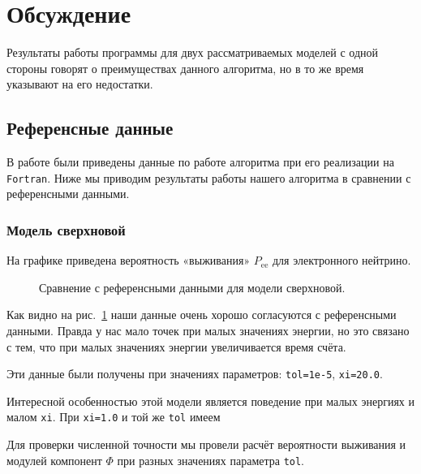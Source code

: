 \documentclass[12pt]{article}
\begin{document}
\section{Обсуждение}

Результаты работы программы для двух рассматриваемых моделей с одной стороны
говорят о преимуществах данного алгоритма, но в то же время указывают на его
недостатки.

\subsection*{Референсные данные}

В работе \cite{casas2016} были приведены данные по работе алгоритма при его
реализации на
\verb|Fortran|. %
Ниже мы приводим результаты работы нашего алгоритма в сравнении с референсными
данными.

\subsubsection*{Модель сверхновой}

На графике приведена вероятность «выживания» \(P_{\text{ee}}\) для электронного
нейтрино.

\begin{figure}[h]
  \hspace*{-2em}
  \caption{\label{fig:1}Сравнение с референсными данными для модели сверхновой.}
\end{figure}

Как видно на рис.~\ref{fig:1} наши данные очень хорошо согласуются с
референсными данными. Правда у нас мало точек при малых значениях энергии, но
это связано с тем, что при малых значениях энергии увеличивается время счёта.

Эти данные были получены при значениях параметров: \verb|tol=1e-5|,
\verb|xi=20.0|.

Интересной особенностью этой модели является поведение при малых энергиях и
малом \verb|xi|. При \verb|xi=1.0| и той же \verb|tol| имеем

Для проверки численной точности мы провели расчёт вероятности выживания и
модулей компонент \(\Phi\) при разных значениях параметра \verb|tol|.
\end{document}
